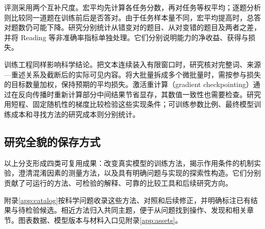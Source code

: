 评测采用两个互补尺度。宏平均先计算各任务分数，再对任务等权平均；逐题分析则比较同一道题在训练前后是否答对。由于任务样本量不同，宏平均提高时，总答对题数仍可能下降。研究分别统计从错变对的题目、从对变错的题目及两者之差，并将 Reading 等非准确率指标单独处理。它们分别说明能力的净收益、获得与损失。

训练工程同样影响科学结论。把文本连续装入有限窗口时，研究核对完整词、来源—重述关系及截断后的实际可见内容。将大批量拆成多个微批量时，需按参与损失的目标数量加权，保持预期的平均损失。激活重计算（gradient checkpointing）通过在反向传播时重新计算部分中间结果节省显存，其数值一致性也需要检查。研究用短程、固定随机性的梯度比较检验这些实现条件；可训练参数比例、最终模型训练成本和寻找方法的研究成本则分别统计。

\subsection{研究全貌的保存方式}

以上分支形成四类可复用成果：改变真实模型的训练方法，揭示作用条件的机制实验，澄清混淆因素的测量方法，以及具有明确问题与实现的探索性构造。它们分别贡献了可运行的方法、可检验的解释、可靠的比较工具和后续研究方向。

附录\ref{app:catalog}按科学问题收录这些方法、对照和后续修正，并明确标注已有结果与待检验候选。相近方法归入共同主题，便于从问题找到操作、发现和相关章节。图表数据、模型版本与材料入口见附录\ref{app:assets}。
